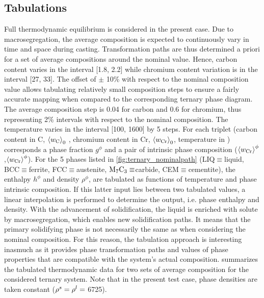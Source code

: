\subsection{Tabulations}
Full thermodynamic equilibrium is considered in the present case. Due to macrosegregation, 
the average composition is expected to continuously vary in time and space during casting. 
Transformation paths are thus determined a priori for a set of average compositions around 
the nominal value. Hence, carbon content varies in the interval [\SI{1.8}{\ucomposition}, \SI{2.2}{\ucomposition}] 
while chromium content variation is in the interval [\SI{27}{\ucomposition}, \SI{33}{\ucomposition}]. The offset of $\pm$ 10\%  with 
respect to the nominal composition value allows tabulating relatively small composition steps
to ensure a fairly accurate mapping when compared to the corresponding ternary phase diagram. The average 
composition step is \SI{0.04}{\ucomposition} for carbon and \SI{0.6}{\ucomposition} for chromium, thus representing 2\% 
intervals with respect to the nominal composition. The temperature varies in the interval 
[\SI{100}{\udegC}, \SI{1600}{\udegC}] by \SI{5}{\udegC} steps. For each triplet (carbon content 
in \si{\ucomposition} C, $\left \langle w_\text{C} \right \rangle_0$ , chromium content in \si{\ucomposition} Cr,  $\left \langle w_\text{Cr} \right \rangle_0$, temperature in \si{\udegK}) 
corresponds a phase fraction $g^\phi$ and a pair of intrinsic phase composition ($\left \langle w_\text{Cr} \right \rangle^\phi$,$\left \langle w_\text{Cr} \right \rangle^\phi$). For the 5 
phases listed in \cref{fig:ternary_nominalpath} (LIQ$\equiv$liquid, BCC$\equiv$ferrite, FCC$\equiv$austenite, 
$\text{M}_7 \text{C}_3 \equiv$carbide, CEM$\equiv$cementite), the enthalpy $h^\phi$ and density $\rho^\phi$, are tabulated 
as functions of temperature and phase intrinsic composition. If this latter input lies between two tabulated 
values, a linear interpolation is performed to determine the output, i.e. phase enthalpy and density. With 
the advancement of solidification, the liquid is enriched with solute by macrosegregation, which enables new 
solidification paths. It means that the primary solidifying phase is not necessarily the same as when considering 
the nominal composition. For this reason, the tabulation approach is interesting inasmuch as it provides phase 
transformation paths and values of phase properties that are compatible with the system’s actual composition. 
 summarizes the tabulated thermodynamic data for two sets of average composition for the considered 
ternary system. Note that in the present test case, phase densities are taken constant ($\rho^s=\rho^l=$ \SI{6725}{\udensity}). 
